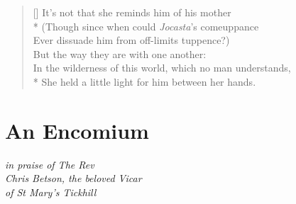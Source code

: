 \documentclass[openany]{amsbook}
\newcommand{\poeticmarginnote}[1]{\marginnote{\footnotesize #1}}
\begin{document}
\settowidth{\versewidth}{In the wilderness of this world, which no man understands,}
\begin{verse}[\versewidth]
\vin It's not that she reminds him of his mother\poeticmarginnote{ES}\\*
\vin \vin (Though since when could \textit{Jocasta}'s comeuppance\\
\vin \vin Ever dissuade him from off-limits tuppence?)\\
\vin But the way they are with one another:\\
In the wilderness of this world, which no man understands,\poeticmarginnote{Bunyan}\\*
She held a little light for him between her hands.
\end{verse}


\chapter*{An Encomium}

\begin{center}
\textit{in praise of The Rev}\\
\textit{Chris Betson, the beloved Vicar}\\
\textit{of St Mary's Tickhill}
\end{center}

\bigskip
\end{document}
